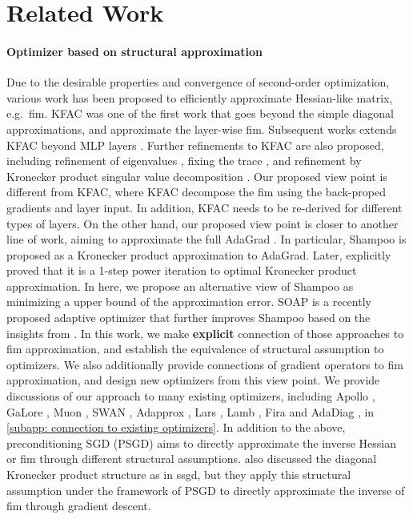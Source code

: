 \section{Related Work}
\label{sec: related work}
\paragraph{Optimizer based on structural approximation}
Due to the desirable properties and convergence of second-order optimization, various work has been proposed to efficiently approximate Hessian-like matrix, e.g.~\gls{fim}. KFAC \citep{martens2015optimizing} was one of the first work that goes beyond the simple diagonal approximations, and approximate the layer-wise \gls{fim}. Subsequent works extends KFAC beyond MLP layers \citep{grosse2016kronecker, martens2018kronecker}. Further refinements to KFAC are also proposed, including refinement of eigenvalues \citep{george2018fast}, fixing the trace \citep{gao2021trace}, and refinement by Kronecker product singular value decomposition \citep{koroko2022efficient}. Our proposed view point is different from KFAC, where KFAC decompose the \gls{fim} using the back-proped gradients and layer input. In addition, KFAC needs to be re-derived for different types of layers. On the other hand, our proposed view point is closer to another line of work, aiming to approximate the full AdaGrad \citep{duchi2011adaptive}. In particular, Shampoo \citep{gupta2018shampoo, anil2020scalable} is proposed as a Kronecker product approximation to AdaGrad. Later, \citep{morwani2024new} explicitly proved that it is a 1-step power iteration to optimal Kronecker product approximation. 
In here, we propose an alternative view of Shampoo as minimizing a upper bound of the approximation error. SOAP \citep{vyas2024soap} is a recently proposed adaptive optimizer that further improves Shampoo based on the insights from \citet{george2018fast}. 
In this work, we make \textbf{explicit} connection of those approaches to \gls{fim} approximation, and establish the equivalence of structural assumption to optimizers. We also additionally provide connections of gradient operators to \gls{fim} approximation, and design new optimizers from this view point. We provide discussions of our approach to many existing optimizers, including Apollo \citep{zhu2024apollo}, GaLore \citep{zhao2024galore}, Muon \citep{jordan2024muon}, SWAN \citep{ma2024swan}, Adapprox \citep{zhao2024adapprox}, Lars \citep{you2017lars}, Lamb \citep{you2019lamb}, Fira \citep{chen2024fira} and AdaDiag \citep{anonymous2024improving}, in \cref{subapp: connection to existing optimizers}. 
In addition to the above, preconditioning SGD (PSGD) \citep{li2017preconditioned, pooladzandi2024curvature} aims to directly approximate the inverse Hessian or \gls{fim} through different structural assumptions. \citet{li2018preconditioner} also discussed the diagonal Kronecker product structure as in \gls{ssgd}, but they apply this structural assumption under the framework of PSGD to directly approximate the inverse of \gls{fim} through gradient descent.  

